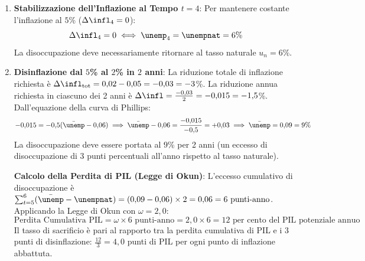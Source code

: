 \begin{esercizio}
\begin{enumerate}
    \item \textbf{Stabilizzazione dell'Inflazione al Tempo $t=4$}:
    Per mantenere costante l'inflazione al $5$\% ($\Delta \infl_4 = 0$):
    \begin{equation*}
        \Delta \infl_4 = 0 \iff \unemp_4 = \unempnat = 6\%
    \end{equation*}
    La disoccupazione deve necessariamente ritornare al tasso naturale $u_n = 6$\%.

    \item \textbf{Disinflazione dal $5$\% al $2$\% in $2$ anni}:
    La riduzione totale di inflazione richiesta è $\Delta \infl_{\text{tot}} = 0{,}02 - 0{,}05 = -0{,}03 = -3$\%.
    La riduzione annua richiesta in ciascuno dei 2 anni è $\Delta \infl = \frac{-0{,}03}{2} = -0{,}015 = -1{,}5$\%.
    Dall'equazione della curva di Phillips:
    \begin{equation*}
        -0{,}015 = -0{,}5 (\bar{\unemp} - 0{,}06) \implies \bar{\unemp} - 0{,}06 = \frac{-0{,}015}{-0{,}5} = +0{,}03 \implies \bar{\unemp} = 0{,}09 = 9\%
    \end{equation*}
    La disoccupazione deve essere portata al $9$\% per 2 anni (un eccesso di disoccupazione di $3$ punti percentuali all'anno rispetto al tasso naturale).
    
    \textbf{Calcolo della Perdita di PIL (Legge di Okun)}:
    L'eccesso cumulativo di disoccupazione è $\sum_{t=5}^6 (\bar{\unemp} - \unempnat) = (0{,}09 - 0{,}06) \times 2 = 0{,}06 = 6\text{ punti-anno}$.
    Applicando la Legge di Okun con $\omega = 2{,}0$:
    \begin{equation*}
        \text{Perdita Cumulativa PIL} = \omega \times 6\text{ punti-anno} = 2{,}0 \times 6 = 12\text{ per cento del PIL potenziale annuo}
    \end{equation*}
    Il tasso di sacrificio è pari al rapporto tra la perdita cumulativa di PIL e i $3$ punti di disinflazione: $\frac{12}{3} = 4{,}0$ punti di PIL per ogni punto di inflazione abbattuta.
\end{enumerate}
\end{esercizio}

